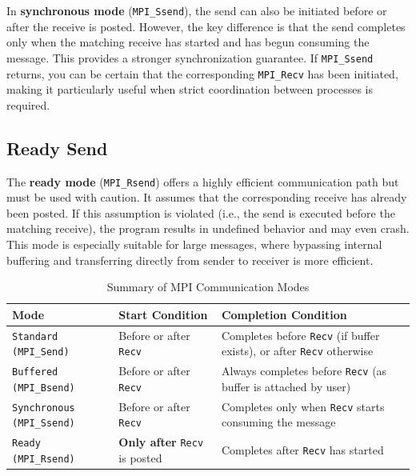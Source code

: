 \documentclass[12pt]{book}
\begin{document}
In \textbf{synchronous mode} (\texttt{MPI\_Ssend}), the send can also be initiated before or after the receive is posted. However, the key difference is that the send completes only when the matching receive has started and has begun consuming the message. This provides a stronger synchronization guarantee. If \texttt{MPI\_Ssend} returns, you can be certain that the corresponding \texttt{MPI\_Recv} has been initiated, making it particularly useful when strict coordination between processes is required.

\subsection*{Ready Send}

The \textbf{ready mode} (\texttt{MPI\_Rsend}) offers a highly efficient communication path but must be used with caution. It assumes that the corresponding receive has already been posted. If this assumption is violated (i.e., the send is executed before the matching receive), the program results in undefined behavior and may even crash. This mode is especially suitable for large messages, where bypassing internal buffering and transferring directly from sender to receiver is more efficient.

\begin{table}[H]
    \centering
    \renewcommand{\arraystretch}{1.3}
    \begin{tabular}{|p{}|p{}|p{}|}
        \hline
        \textbf{Mode} & \textbf{Start Condition} & \textbf{Completion Condition} \\
        \hline
        \texttt{Standard (MPI\_Send)} & Before or after \texttt{Recv} & Completes before \texttt{Recv} (if buffer exists), or after \texttt{Recv} otherwise \\
        \hline
        \texttt{Buffered (MPI\_Bsend)} & Before or after \texttt{Recv} & Always completes before \texttt{Recv} (as buffer is attached by user) \\
        \hline
        \texttt{Synchronous (MPI\_Ssend)} & Before or after \texttt{Recv} & Completes only when \texttt{Recv} starts consuming the message \\
        \hline
        \texttt{Ready (MPI\_Rsend)} & \textbf{Only after} \texttt{Recv} is posted & Completes after \texttt{Recv} has started \\
        \hline
    \end{tabular}
    \caption{Summary of MPI Communication Modes}
    \label{tab:comm_modes}
\end{table}
\end{document}
